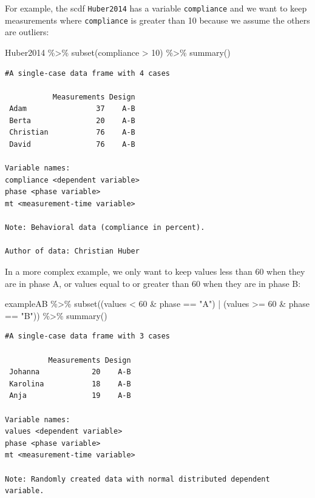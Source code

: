 \documentclass[
  letterpaper,
  DIV=11,
  numbers=noendperiod]{scrreprt}
\newenvironment{Shaded}{\begin{snugshade}}{\end{snugshade}}
\newcommand{\DecValTok}[1]{\textcolor[rgb]{0.68,0.00,0.00}{#1}}
\newcommand{\FunctionTok}[1]{\textcolor[rgb]{0.28,0.35,0.67}{#1}}
\newcommand{\NormalTok}[1]{\textcolor[rgb]{0.00,0.23,0.31}{#1}}
\newcommand{\SpecialCharTok}[1]{\textcolor[rgb]{0.37,0.37,0.37}{#1}}
\newcommand{\StringTok}[1]{\textcolor[rgb]{0.13,0.47,0.30}{#1}}
\begin{document}
For example, the scdf \texttt{Huber2014} has a variable
\texttt{compliance} and we want to keep measurements where
\texttt{compliance} is greater than 10 because we assume the others are
outliers:

\begin{Shaded}
\begin{Highlighting}[]
\NormalTok{Huber2014 }\SpecialCharTok{\%\textgreater{}\%}
  \FunctionTok{subset}\NormalTok{(compliance }\SpecialCharTok{\textgreater{}} \DecValTok{10}\NormalTok{) }\SpecialCharTok{\%\textgreater{}\%}
  \FunctionTok{summary}\NormalTok{()}
\end{Highlighting}
\end{Shaded}

\begin{verbatim}
#A single-case data frame with 4 cases

           Measurements Design
 Adam                37    A-B
 Berta               20    A-B
 Christian           76    A-B
 David               76    A-B

Variable names:
compliance <dependent variable>
phase <phase variable>
mt <measurement-time variable>

Note: Behavioral data (compliance in percent). 

Author of data: Christian Huber 
\end{verbatim}

In a more complex example, we only want to keep values less than 60 when
they are in phase A, or values equal to or greater than 60 when they are
in phase B:

\begin{Shaded}
\begin{Highlighting}[]
\NormalTok{exampleAB }\SpecialCharTok{\%\textgreater{}\%}
  \FunctionTok{subset}\NormalTok{((values }\SpecialCharTok{\textless{}} \DecValTok{60} \SpecialCharTok{\&}\NormalTok{ phase }\SpecialCharTok{==} \StringTok{"A"}\NormalTok{) }\SpecialCharTok{|}\NormalTok{ (values }\SpecialCharTok{\textgreater{}=} \DecValTok{60} \SpecialCharTok{\&}\NormalTok{ phase }\SpecialCharTok{==} \StringTok{"B"}\NormalTok{)) }\SpecialCharTok{\%\textgreater{}\%}
  \FunctionTok{summary}\NormalTok{()}
\end{Highlighting}
\end{Shaded}

\begin{verbatim}
#A single-case data frame with 3 cases

          Measurements Design
 Johanna            20    A-B
 Karolina           18    A-B
 Anja               19    A-B

Variable names:
values <dependent variable>
phase <phase variable>
mt <measurement-time variable>

Note: Randomly created data with normal distributed dependent variable. 
\end{verbatim}
\end{document}
